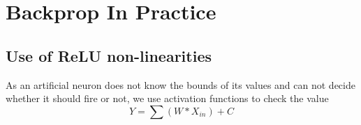 \chapter{Backprop In Practice}\label{chp:Backprop in Practice}
\setlength{\abovedisplayskip}{7pt}
\setlength{\belowdisplayskip}{7pt}

\section{Use of ReLU non-linearities}
As an artificial neuron does not know the bounds of its values and can not decide whether it should fire or not, we use activation functions to check the value 
\begin{equation}
    Y = \sum (W * X_{in}) + C
\end{equation}

